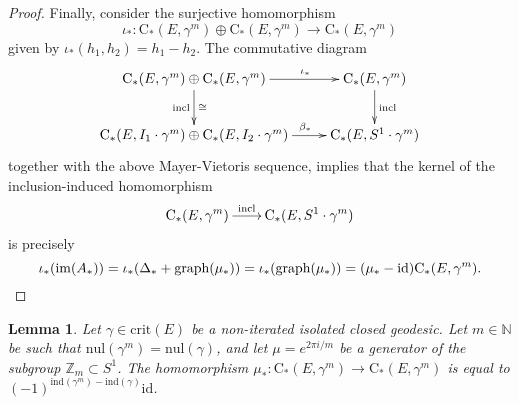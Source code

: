 \documentclass[reqno]{amsart}
\numberwithin{equation}{section}
\theoremstyle{personal}%
\newtheorem{lem}[thm]{Lemma}
\theoremstyle{definition}
\newcommand{\N}{\mathds{N}}
\newcommand{\Z}{\mathds{Z}}
\newcommand{\incl}{\mathrm{incl}}
\newcommand{\crit}{\mathrm{crit}}
\newcommand{\Loc}{\mathrm{C}}
\newcommand{\ind}{\mathrm{ind}}
\newcommand{\nul}{\mathrm{nul}}
\DeclareRobustCommand{\llongrightarrow}{\relbar\joinrel\relbar\joinrel\rightarrow}
\DeclareMathOperator*{\ttoup}{\llongrightarrow}
\begin{document}
\begin{proof}
Finally, consider the surjective homomorphism 
\[\iota_*:\Loc_*(E,\gamma^m)\oplus\Loc_*(E,\gamma^m)\to\Loc_*(E,\gamma^m)\]
given by $\iota_*(h_1,h_2)=h_1-h_2$. The commutative diagram
\begin{align*}
\xymatrix{
\Loc_*(E,\gamma^m) \oplus \Loc_*(E,\gamma^m)
\ar[r]^{\quad\qquad\iota_*} \ar[d]_{\incl}^{\cong}
&
\Loc_*(E,\gamma^m) \ar[d]^{\incl}\\
\Loc_*(E,I_1\cdot\gamma^m) \oplus \Loc_*(E,I_2\cdot\gamma^m)
\ar[r]^{\qquad\quad\beta_*} 
&
\Loc_*(E,S^1\cdot\gamma^m)
} 
\end{align*}
together with the above Mayer-Vietoris sequence, implies that the kernel of the inclusion-induced homomorphism 
\begin{align*}
\Loc_*(E,\gamma^m)\ttoup^{\incl}\Loc_*(E,S^1\cdot\gamma^m)
\end{align*}
is precisely
\[
\iota_*(\mathrm{im}(A_*))=\iota_*(\Delta_*+\textrm{graph}(\mu_*))
=\iota_*(\textrm{graph}(\mu_*))=(\mu_*-\mathrm{id})\Loc_*(E,\gamma^m).
\qedhere
\]
\end{proof}

\begin{lem}
\label{l:mu_on_loc}
Let $\gamma\in\crit(E)$ be a non-iterated isolated closed geodesic. Let $m\in\N$ be such that $\nul(\gamma^m)=\nul(\gamma)$, and let $\mu=e^{2\pi i/m}$ be a generator of the subgroup $\Z_m\subset S^1$. The homomorphism $\mu_*:\Loc_*(E,\gamma^m)\to\Loc_*(E,\gamma^m)$ is equal to $(-1)^{\ind(\gamma^m)-\ind(\gamma)}\mathrm{id}$.
\end{lem}
\end{document}
